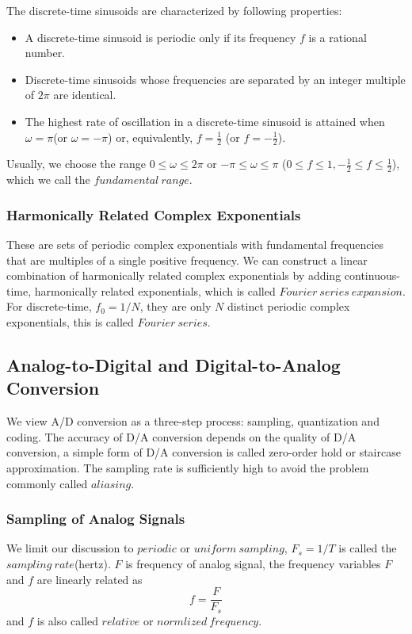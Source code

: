 \documentclass[10pt,a4paper,oneside]{article}
\begin{document}
The discrete-time sinusoids are characterized by following properties:
\begin{itemize}
	\item  A discrete-time sinusoid is periodic only if its frequency $f$ is a rational number.
	\item Discrete-time sinusoids whose frequencies are separated by an integer multiple of $2\pi$ are identical.
	\item The highest rate of oscillation in a discrete-time sinusoid is attained when $\omega=\pi$(or $\omega=-\pi$) or, equivalently, $f=\frac{1}{2}$ (or $f=-\frac{1}{2}$).
\end{itemize}
Usually, we choose the range $0\leqslant\omega\leqslant2\pi$ or $-\pi\leqslant\omega\leqslant\pi$ ($0\leqslant f\leqslant1, -\frac{1}{2}\leqslant f\leqslant\frac{1}{2}$), which we call the $fundamental\ range$.
\subsubsection{Harmonically Related Complex Exponentials}
These are sets of periodic complex exponentials with fundamental frequencies that are multiples of a single positive frequency. We can construct a linear combination of harmonically related complex exponentials by adding continuous-time, harmonically related exponentials, which is called $Fourier\ series\ expansion$. For discrete-time, $f_0=1/N$, they are only $N$ distinct periodic complex exponentials, this is called $Fourier\ series$.
\subsection{Analog-to-Digital and Digital-to-Analog Conversion}
We view A/D conversion as a three-step process: sampling, quantization and coding. The accuracy of D/A conversion depends on the quality of D/A conversion, a simple form of D/A conversion is called zero-order hold or staircase approximation. The sampling rate is sufficiently high to avoid the problem commonly called $aliasing$.
\subsubsection{Sampling of Analog Signals}
We limit our discussion to $periodic$ or $uniform\ sampling$, $F_s=1/T$ is called the $sampling\ rate$(hertz). $F$ is frequency of analog signal, the frequency variables $F$ and $f$ are linearly related as
\[
f=\frac{F}{F_s}
\]
and $f$ is also called $relative$ or $normlized\ frequency$.
\end{document}
